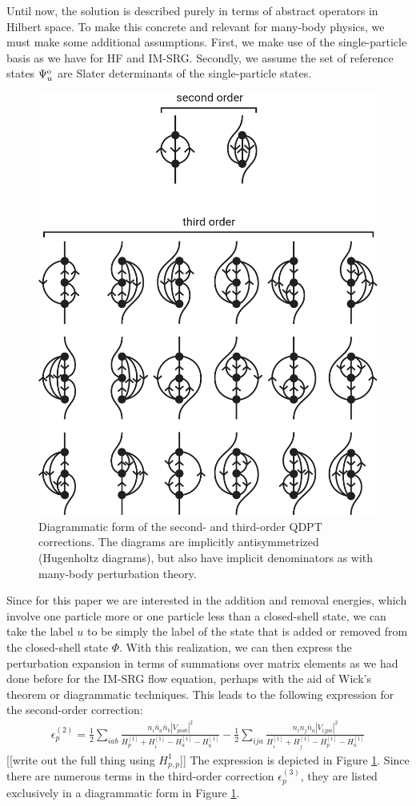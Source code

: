 \documentclass[amsmath, amssymb, aps, floatfix, nofootinbib, preprintnumbers,showpacs, superscriptaddress, twocolumn]{revtex4-1}
\begin{document}
Until now, the solution is described purely in terms of abstract operators in Hilbert space.  To make this concrete and relevant for many-body physics, we must make some additional assumptions.  First, we make use of the single-particle basis as we have for HF and IM-SRG.  Secondly, we assume the set of reference states $\Psi^{\text o}_u$ are Slater determinants of the single-particle states.

\begin{figure}
\includegraphics[width=.48\textwidth]{fig-diagrams-sfe}
\caption{Diagrammatic form of the second- and third-order QDPT corrections.  The diagrams are implicitly antisymmetrized (Hugenholtz diagrams), but also have implicit denominators as with many-body perturbation theory.}
\label{fig:diagrams-sfe}
\end{figure}

Since for this paper we are interested in the addition and removal energies, which involve one particle more or one particle less than a closed-shell state, we can take the label $u$ to be simply the label of the state that is added or removed from the closed-shell state $\Phi$.  With this realization, we can then express the perturbation expansion in terms of summations over matrix elements as we had done before for the IM-SRG flow equation, perhaps with the aid of Wick's theorem or diagrammatic techniques.  This leads to the following expression for the second-order correction:
\begin{gather*}
  \epsilon_p^{(2)} =
      \frac{1}{2} \sum_{i a b} \frac{n_i \bar{n}_a \bar{n}_b |V_{p i a b}|^2}{H^{[1]}_p + H^{[1]}_i - H^{[1]}_a - H^{[1]}_b}
    - \frac{1}{2} \sum_{i j a} \frac{n_i n_j \bar{n}_a |V_{i j p a}|^2}{H^{[1]}_i + H^{[1]}_j - H^{[1]}_p - H^{[1]}_a}
\end{gather*}
[[write out the full thing using $H^1_{p,p}$]]
The expression is depicted in Figure \ref{fig:diagrams-sfe}.  Since there are numerous terms in the third-order correction $\epsilon_p^{(3)}$, they are listed exclusively in a diagrammatic form in Figure \ref{fig:diagrams-sfe}.
\end{document}
